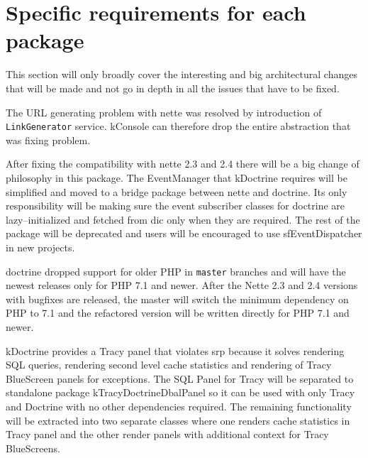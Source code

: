 \section{Specific requirements for each package} \label{sec:roadmap:each-package}

This section will only broadly cover the interesting and big architectural changes that will be made and not go in depth in all the issues that have to be fixed.


The URL generating problem with \gls{nette} was resolved by introduction of \lstinline{LinkGenerator} service. \gls{kConsole} can therefore drop the entire abstraction that was fixing problem.


After fixing the compatibility with \gls{nette} 2.3 and 2.4 there will be a big change of philosophy in this package. The EventManager that \gls{kDoctrine} requires will be simplified and moved to a bridge package between \gls{nette} and \gls{doctrine}. Its only responsibility will be making sure the event subscriber classes for \gls{doctrine} are lazy--initialized and fetched from \gls{dic} only when they are required. The rest of the package will be deprecated and users will be encouraged to use \gls{sfEventDispatcher} in new projects.




\gls{doctrine} dropped support for older PHP in \lstinline{master} branches and will have the newest releases only for PHP 7.1 and newer. After the Nette 2.3 and 2.4 versions with bugfixes are released, the master will switch the minimum dependency on PHP to 7.1 and the refactored version will be written directly for PHP 7.1 and newer.

\gls{kDoctrine} provides a Tracy panel that violates \gls{srp} because it solves rendering SQL queries, rendering second level cache statistics and rendering of Tracy BlueScreen panels for exceptions. The SQL Panel for Tracy will be separated to standalone package \gls{kTracyDoctrineDbalPanel} so it can be used with only Tracy and Doctrine with no other dependencies required. The remaining functionality will be extracted into two separate classes where one renders cache statistics in Tracy panel and the other render panels with additional context for Tracy BlueScreens.


